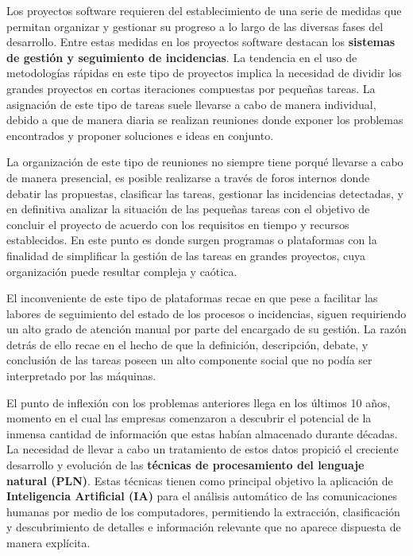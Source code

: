 
Los proyectos software requieren del establecimiento de una serie de medidas que permitan organizar y gestionar su progreso a lo largo de las diversas fases del desarrollo. Entre estas medidas en los proyectos software destacan los \textbf{sistemas de gestión y seguimiento de incidencias}. La tendencia en el uso de metodologías rápidas en este tipo de proyectos implica la necesidad de dividir los grandes proyectos en cortas iteraciones compuestas por pequeñas tareas. La asignación de este tipo de tareas suele llevarse a cabo de manera individual, debido a que de manera diaria se realizan reuniones donde exponer los problemas encontrados y proponer soluciones e ideas en conjunto.

La organización de este tipo de reuniones no siempre tiene porqué llevarse a cabo de manera presencial, es posible realizarse a través de foros internos donde debatir las propuestas, clasificar las tareas, gestionar las incidencias detectadas, y en definitiva analizar la situación de las pequeñas tareas con el objetivo de concluir el proyecto de acuerdo con los requisitos en tiempo y recursos establecidos. En este punto es donde surgen programas o plataformas con la finalidad de simplificar la gestión de las tareas en grandes proyectos, cuya organización puede resultar compleja y caótica.

El inconveniente de este tipo de plataformas recae en que pese a facilitar las labores de seguimiento del estado de los procesos o incidencias, siguen requiriendo un alto grado de atención manual por parte del encargado de su gestión. La razón detrás de ello recae en el hecho de que la definición, descripción, debate, y conclusión de las tareas poseen un alto componente social que no podía ser interpretado por las máquinas.

El punto de inflexión con los problemas anteriores llega en los últimos 10 años, momento en el cual las empresas comenzaron a descubrir el potencial de la inmensa cantidad de información que estas habían almacenado durante décadas. La necesidad de llevar a cabo un tratamiento de estos datos propició el creciente desarrollo y evolución de las \textbf{técnicas de procesamiento del lenguaje natural (PLN)}. Estas técnicas tienen como principal objetivo la aplicación de \textbf{Inteligencia Artificial (IA)} para el análisis automático de las comunicaciones humanas por medio de los computadores, permitiendo la extracción, clasificación y descubrimiento de detalles e información relevante que no aparece dispuesta de manera explícita.

